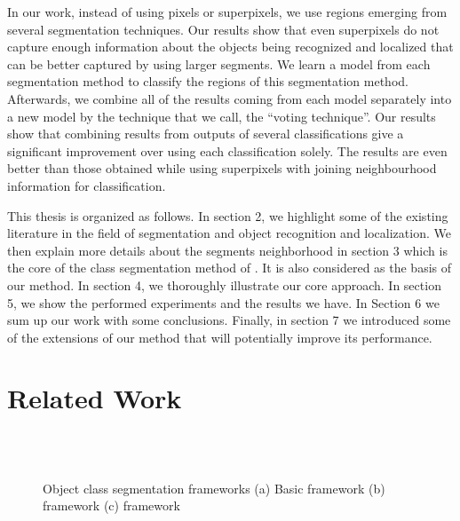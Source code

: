 \documentclass[twoside,11pt]{article}
\begin{document}
In our work, instead of using pixels or superpixels, we use regions emerging
from several segmentation techniques. Our results show that even superpixels
do not capture enough information about the objects being recognized and
localized that can be better captured by using larger segments.
We learn a model from each segmentation method
to classify the regions of this segmentation method. Afterwards, we combine
all of the results coming from each model separately into a new model by the
technique that we call, the ``voting technique''. Our results show that
combining
results from outputs of several classifications give a significant improvement
over using each classification solely. The results are even better than those
obtained while using superpixels with joining neighbourhood information for
classification.

This thesis is organized as follows. In section 2, we highlight some of the
existing
literature in the field of segmentation and object recognition and localization.
We then explain more details about the segments neighborhood in section 3 which is the
core of the class segmentation method of \cite{fulkerson09class}. It is also
considered as the basis of our method. In section 4, we thoroughly illustrate
our core approach. In section 5, we show the performed experiments and the results we
have. In Section 6 we sum up our work with some conclusions. Finally, in section 7
we introduced some of the extensions of our method that will potentially improve
its performance.

\section{Related Work}

\begin{figure}[!t]
\centering
{}\\
\\
\caption{Object class segmentation frameworks (a) Basic framework (b) \cite{PSH08} framework
(c) \cite{fulkerson09class} framework}
\label{fig:obj_seg_model}
\end{figure}
\end{document}
